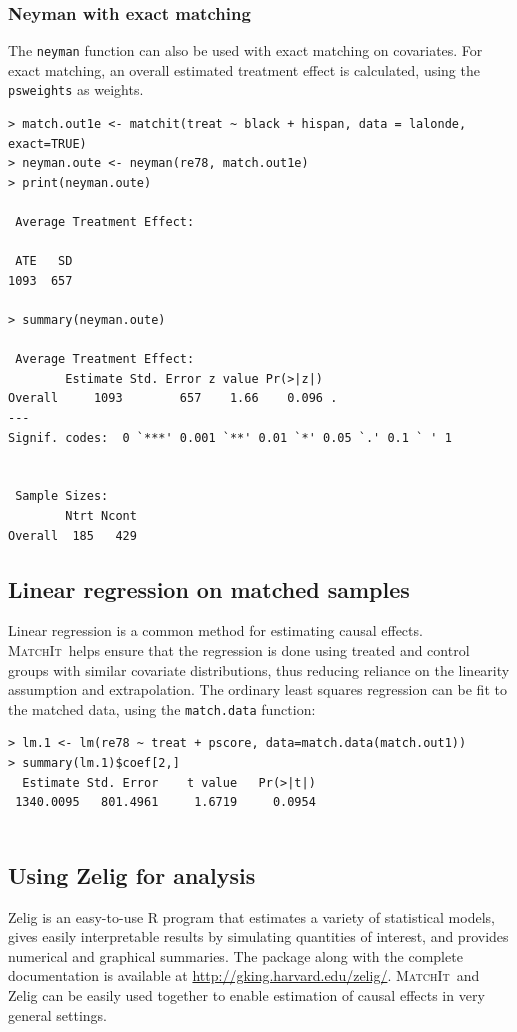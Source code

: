 \documentclass[oneside,letterpaper,titlepage]{article}
\newcommand{\MatchIt}{\textsc{MatchIt}}
\begin{document}
\subsubsection{Neyman with exact matching}
The {\tt neyman} function can also be used with exact matching on
covariates.  For exact matching, an overall estimated treatment effect
is calculated, using the {\tt psweights} as weights.

\begin{verbatim}
> match.out1e <- matchit(treat ~ black + hispan, data = lalonde, exact=TRUE)
> neyman.oute <- neyman(re78, match.out1e)
> print(neyman.oute)
 
 Average Treatment Effect:
  
 ATE   SD
1093  657
 
> summary(neyman.oute)
 
 Average Treatment Effect:
        Estimate Std. Error z value Pr(>|z|)
Overall     1093        657    1.66    0.096 .
---
Signif. codes:  0 `***' 0.001 `**' 0.01 `*' 0.05 `.' 0.1 ` ' 1
 
 
 Sample Sizes:
        Ntrt Ncont
Overall  185   429
\end{verbatim}

\subsection{Linear regression on matched samples}
Linear regression is a common method for estimating causal effects.
\MatchIt\ helps ensure that the regression is done using treated and
control groups with similar covariate distributions, thus reducing
reliance on the linearity assumption and extrapolation.  The ordinary
least squares regression can be fit to the matched data, using the
{\tt match.data} function:

\begin{verbatim}
> lm.1 <- lm(re78 ~ treat + pscore, data=match.data(match.out1))
> summary(lm.1)$coef[2,]
  Estimate Std. Error    t value   Pr(>|t|)
 1340.0095   801.4961     1.6719     0.0954


\end{verbatim} 

\subsection{Using Zelig for analysis}
Zelig is an easy-to-use R program that estimates a variety of statistical
models, gives easily interpretable results by simulating quantities of
interest, and provides numerical and graphical summaries.  The package
along with the complete documentation is available at
\href{http://gking.harvard.edu/zelig/}{http://gking.harvard.edu/zelig/}.
\MatchIt\ and Zelig can be easily used together to enable estimation
of causal effects in very general settings.
\end{document}
